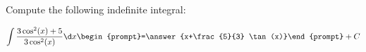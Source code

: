 \documentclass{ximera}
\author{Jim Talamo}
\begin{document}
\begin{exercise}
Compute the following indefinite integral:

\[
\int \frac{3\cos^2(x)+5}{3\cos^2(x)} \d x 
\begin{prompt}=\answer{x+\frac{5}{3} \tan(x)}\end{prompt}+C
\]
\end{exercise}
\end{document}
